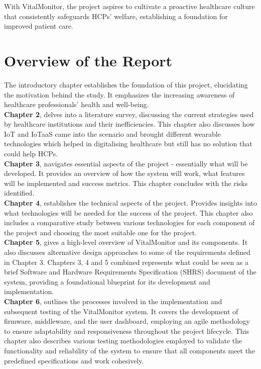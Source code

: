 \noindent \noindent With VitalMonitor, the project aspires to cultivate a proactive healthcare culture that consistently safeguards HCPs' welfare, establishing a foundation for improved patient care.


\section{Overview of the Report}
The introductory chapter establishes the foundation of this project, elucidating the motivation behind the study. It emphasizes the increasing awareness of healthcare professionals’ health and well-being. \\

\noindent\textbf{Chapter 2}, delves into a literature survey, discussing the current strategies used by healthcare institutions and their inefficiencies. This chapter also discusses how IoT and IoTaaS came into the scenario and brought different wearable technologies which helped in digitalising healthcare but still has no solution that could help HCPs. \\

\noindent\textbf{Chapter 3},  navigates essential aspects of the project - essentially what will be developed. It provides an overview of how the system will work, what features will be implemented and success metrics. This chapter concludes with the risks identified. \\

\noindent\textbf{Chapter 4},  establishes the technical aspects of the project. Provides insights into what technologies will be needed for the success of the project. This chapter also includes a comparative study between various technologies for each component of the project and choosing the most suitable one for the project. \\

\noindent\textbf{Chapter 5}, gives a high-level overview of VitalMonitor and its components. It also discusses alternative 
design approaches to some of the requirements defined in Chapter 3. Chapters 3, 4 and 5 combined represents what could be seen as a brief Software and Hardware Requirements Specification (SHRS) document of the system, providing a foundational blueprint for its development and implementation. \\

\noindent\textbf{Chapter 6}, outlines the processes involved in the implementation and subsequent testing of the VitalMonitor system. It covers the development of firmware, middleware, and the user dashboard, employing an agile methodology to ensure adaptability and responsiveness throughout the project lifecycle. This chapter also describes various testing methodologies employed to validate the functionality and reliability of the system to ensure that all components meet the predefined specifications and work cohesively.\\

